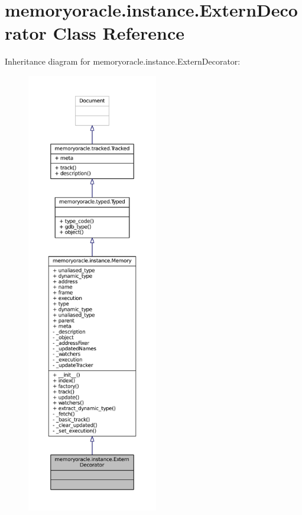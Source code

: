 \hypertarget{classmemoryoracle_1_1instance_1_1ExternDecorator}{}\section{memoryoracle.\+instance.\+Extern\+Decorator Class Reference}
\label{classmemoryoracle_1_1instance_1_1ExternDecorator}


Inheritance diagram for memoryoracle.\+instance.\+Extern\+Decorator\+:
\nopagebreak
\begin{figure}[H]
\begin{center}
\leavevmode
\includegraphics[height=550pt]{classmemoryoracle_1_1instance_1_1ExternDecorator__inherit__graph}
\end{center}
\end{figure}


